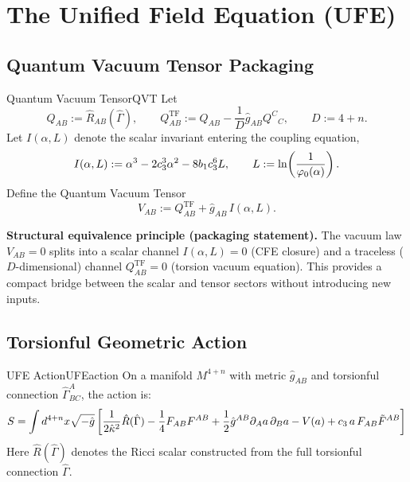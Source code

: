 \section{The Unified Field Equation (UFE)}

\subsection{Quantum Vacuum Tensor Packaging}

\begin{definition}{Quantum Vacuum Tensor}{QVT}
Let
\begin{equation}
Q_{AB} := \hat{R}_{AB}(\hat{\Gamma}),
\qquad
Q^{\mathrm{TF}}_{AB} := Q_{AB} - \frac{1}{D}\hat{g}_{AB} Q^{C}{}_{C},
\qquad D:=4+n.
\end{equation}
Let $I(\alpha,L)$ denote the scalar invariant entering the coupling equation,
\begin{equation}
I(\alpha,L) := \alpha^3 - 2c_3^3\alpha^2 - 8 b_1 c_3^6 L,
\qquad L := \ln\!\left(\frac{1}{\varphi_0(\alpha)}\right).
\end{equation}
Define the Quantum Vacuum Tensor
\begin{equation}
V_{AB} := Q^{\mathrm{TF}}_{AB} + \hat{g}_{AB}\, I(\alpha,L).
\end{equation}

\tcblower
\textbf{Structural equivalence principle (packaging statement).}
The vacuum law $V_{AB}=0$ splits into a scalar channel $I(\alpha,L)=0$ (CFE closure)
and a traceless ($D$-dimensional) channel $Q^{\mathrm{TF}}_{AB}=0$ (torsion vacuum equation).
This provides a compact bridge between the scalar and tensor sectors without introducing new inputs.
\end{definition}

\subsection{Torsionful Geometric Action}

\begin{definition}{UFE Action}{UFEaction}
On a manifold $M^{4+n}$ with metric $\hat{g}_{AB}$ and torsionful connection 
$\hat{\Gamma}^A_{BC}$, the action is:
\begin{equation}
    S = \int d^{4+n}x\sqrt{-\hat{g}}\left[
        \frac{1}{2\hat{\kappa}^2}\hat{R}(\hat{\Gamma}) 
        - \frac{1}{4}F_{AB}F^{AB}
        + \frac{1}{2}\hat{g}^{AB}\partial_A a\,\partial_B a 
        - V(a) 
        + c_3\, a\, F_{AB}\tilde{F}^{AB}
    \right]
\end{equation}
Here $\hat{R}(\hat{\Gamma})$ denotes the Ricci scalar constructed from the full torsionful connection $\hat{\Gamma}$.
\end{definition}

